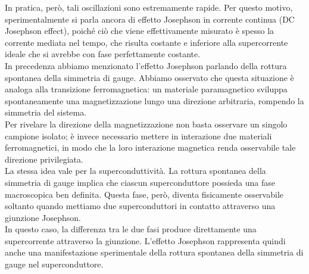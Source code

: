 In pratica, però, tali oscillazioni sono estremamente rapide. Per questo motivo, sperimentalmente si parla ancora di effetto Josephson in corrente continua (DC Josephson effect), poiché ciò che viene effettivamente misurato è spesso la corrente mediata nel tempo, che risulta costante e inferiore alla supercorrente ideale che si avrebbe con fase perfettamente costante.\\
In precedenza abbiamo menzionato l'effetto Josephson parlando della rottura spontanea della simmetria di gauge. Abbiamo osservato che questa situazione è analoga alla transizione ferromagnetica: un materiale paramagnetico sviluppa spontaneamente una magnetizzazione lungo una direzione arbitraria, rompendo la simmetria del sistema.\\
Per rivelare la direzione della magnetizzazione non basta osservare un singolo campione isolato; è invece necessario mettere in interazione due materiali ferromagnetici, in modo che la loro interazione magnetica renda osservabile tale direzione privilegiata.\\
La stessa idea vale per la superconduttività. La rottura spontanea della simmetria di gauge implica che ciascun superconduttore possieda una fase macroscopica ben definita. Questa fase, però, diventa fisicamente osservabile soltanto quando mettiamo due superconduttori in contatto attraverso una giunzione Josephson.\\
In questo caso, la differenza tra le due fasi produce direttamente una supercorrente attraverso la giunzione. L'effetto Josephson rappresenta quindi anche una manifestazione sperimentale della rottura spontanea della simmetria di gauge nel superconduttore.
